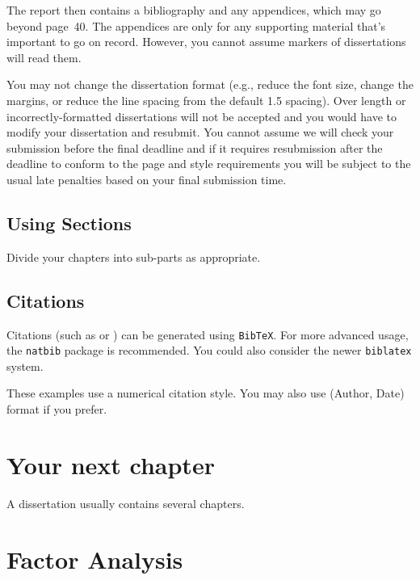 \documentclass[msc,deptreport.inf]{infthesis} %
\begin{document}
The report then contains a bibliography and any appendices, which may go beyond
page~40. The appendices are only for any supporting material that's important to
go on record. However, you cannot assume markers of dissertations will read them.

You may not change the dissertation format (e.g., reduce the font
size, change the margins, or reduce the line spacing from the default
1.5 spacing). Over length or incorrectly-formatted dissertations will
not be accepted and you would have to modify your dissertation and
resubmit.  You cannot assume we will check your submission before the
final deadline and if it requires resubmission after the deadline to
conform to the page and style requirements you will be subject to the
usual late penalties based on your final submission time.

\section{Using Sections}

Divide your chapters into sub-parts as appropriate.

\section{Citations}

Citations (such as \cite{P1} or \cite{P2}) can be generated using
\texttt{BibTeX}. For more advanced usage, the \texttt{natbib} package is
recommended. You could also consider the newer \texttt{biblatex} system.

These examples use a numerical citation style. You may also use
(Author, Date) format if you prefer.

\chapter{Your next chapter}

A dissertation usually contains several chapters.

\chapter{Factor Analysis}\label{sec:fa}
\end{document}

